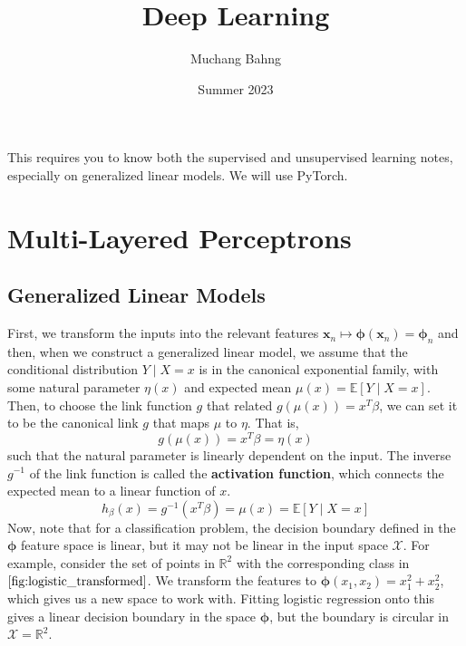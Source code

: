 \documentclass{article}
\theoremstyle{definition}
\theoremstyle{remark}
\theoremstyle{definition}
\begin{document}
\pagestyle{fancy}

\cfoot{\thepage / \pageref{LastPage}}

\title{Deep Learning}
\author{Muchang Bahng}
\date{Summer 2023}

\maketitle

\tableofcontents

\pagebreak 

This requires you to know both the supervised and unsupervised learning notes, especially on generalized linear models. We will use PyTorch. 

\section{Multi-Layered Perceptrons}

\subsection{Generalized Linear Models}

First, we transform the inputs into the relevant features $\mathbf{x}_n \mapsto \boldsymbol{\phi} (\mathbf{x}_n) = \boldsymbol{\phi}_n$ and then, when we construct a generalized linear model, we assume that the conditional distribution $Y \mid X = x$ is in the canonical exponential family, with some natural parameter $\eta(x)$ and expected mean $\mu(x) = \mathbb{E}[Y \mid X = x]$. Then, to choose the link function $g$ that related $g(\mu(x)) = x^T \beta$, we can set it to be the canonical link $g$ that maps $\mu$ to $\eta$. That is, 
\[g(\mu(x)) = x^T \beta = \eta (x)\]
such that the natural parameter is linearly dependent on the input. The inverse $g^{-1}$ of the link function is called the \textbf{activation function}, which connects the expected mean to a linear function of $x$. 
\[h_\beta (x) = g^{-1} (x^T \beta) = \mu(x) = \mathbb{E}[Y \mid X = x]\]
Now, note that for a classification problem, the decision boundary defined in the $\boldsymbol{\phi}$ feature space is linear, but it may not be linear in the input space $\mathcal{X}$. For example, consider the set of points in $\mathbb{R}^2$ with the corresponding class in $\ref{fig:logistic_transformed}$. We transform the features to $\boldsymbol{\phi}(x_1, x_2) = x_1^2 + x_2^2$, which gives us a new space to work with. Fitting logistic regression onto this gives a linear decision boundary in the space $\boldsymbol{\phi}$, but the boundary is circular in $\mathcal{X} = \mathbb{R}^2$. 
\end{document}
